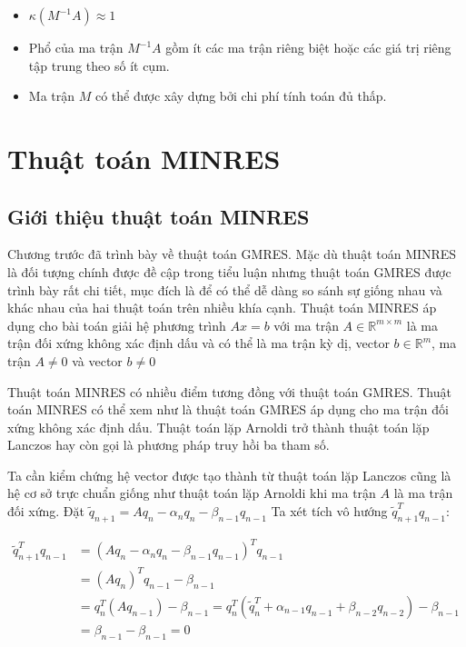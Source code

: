 \documentclass[14pt, a4paper]{article}
\numberwithin{equation}{section}
\numberwithin{algorithm}{section}
\numberwithin{figure}{section}
\numberwithin{dl}{section}
\numberwithin{md}{section}
\numberwithin{bd}{section}
\numberwithin{dn}{section}
\begin{document}
\begin{itemize}
    \item $\kappa(M^{-1}A)\approx 1$
    \item Phổ của ma trận $M^{-1}A$ gồm ít các ma trận riêng biệt hoặc các giá trị riêng tập trung theo số ít cụm.
    \item Ma trận $M$ có thể được xây dựng bởi chi phí tính toán đủ thấp.
\end{itemize}

\section{Thuật toán MINRES}

\subsection{Giới thiệu thuật toán MINRES}

Chương trước đã trình bày về thuật toán GMRES. Mặc dù thuật toán MINRES là đối tượng chính được đề cập trong tiểu luận nhưng thuật toán GMRES được trình bày rất chi tiết, mục đích là để có thể dễ dàng so sánh sự giống nhau và khác nhau của hai thuật toán trên nhiều khía cạnh. Thuật toán MINRES áp dụng cho bài toán giải hệ phương trình $Ax=b$ với ma trận $A \in \mathbb{R}^{m \times m}$ là ma trận đối xứng không xác định dấu và có thể là ma trận kỳ dị, vector $b \in \mathbb{R}^m$, ma trận $A \neq 0$ và vector $b \neq 0$

Thuật toán MINRES có nhiều điểm tương đồng với thuật toán GMRES. Thuật toán MINRES có thể xem như là thuật toán GMRES áp dụng cho ma trận đối xứng không xác định dấu.
Thuật toán lặp Arnoldi trở thành thuật toán lặp Lanczos hay còn gọi là phương pháp truy hồi ba tham số.

Ta cần kiểm chứng hệ vector được tạo thành từ thuật toán lặp Lanczos cũng là hệ cơ sở trực chuẩn giống như thuật toán lặp Arnoldi khi ma trận $A$ là ma trận đối xứng. Đặt $\tilde{q}_{n+1}=Aq_{n} - \alpha_n q_n - \beta_{n-1}q_{n-1}$
Ta xét tích vô hướng $\tilde{q}_{n+1}^T q_{n-1}$:

\begin{equation}
    \begin{aligned}
        \tilde{q}_{n+1}^T q_{n-1}&=(Aq_{n} - \alpha_n q_n - \beta_{n-1}q_{n-1})^T q_{n-1} \\
        & = (Aq_{n})^T q_{n-1} - \beta_{n-1}\\
        & =q_{n}^T (Aq_{n-1}) - \beta_{n-1}=q_n^T(\tilde{q}_n^T + \alpha_{n-1}q_{n-1} + \beta_{n-2}q_{n-2})-\beta_{n-1} \\
        &= \beta_{n-1} - \beta_{n-1} = 0
    \end{aligned}
\end{equation}
\end{document}
